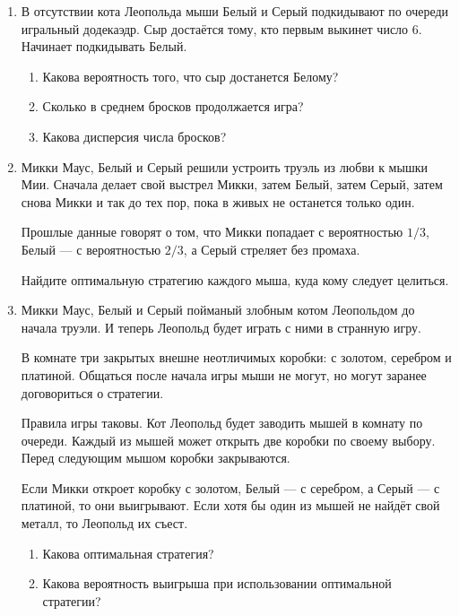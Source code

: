\begin{enumerate}
\item В отсутствии кота Леопольда мыши Белый и Серый подкидывают по очереди
игральный додекаэдр.
Сыр достаётся тому, кто первым выкинет число 6. Начинает подкидывать Белый.
\begin{enumerate}
  \item Какова вероятность того, что сыр достанется Белому?
  \item Сколько в среднем бросков продолжается игра?
  \item Какова дисперсия числа бросков?
\end{enumerate}

\item Микки Маус, Белый и Серый решили устроить труэль из любви к мышки Мии.
Сначала делает свой выстрел Микки, затем Белый, затем Серый, затем снова Микки и так до тех пор,
пока в живых не останется только один.

Прошлые данные говорят о том, что Микки попадает с вероятностью $1/3$,
Белый — с вероятностью $2/3$, а Серый стреляет без промаха.

Найдите оптимальную стратегию каждого мыша, куда кому следует целиться.

\item Микки Маус, Белый и Серый пойманый злобным котом Леопольдом до начала труэли.
И теперь Леопольд будет играть с ними в странную игру.

В комнате три закрытых внешне неотличимых коробки: с золотом, серебром и платиной.
Общаться после начала игры мыши не могут, но могут заранее договориться о стратегии.

Правила игры таковы. Кот Леопольд будет заводить мышей в комнату по очереди.
Каждый из мышей может открыть две коробки по своему выбору.
Перед следующим мышом коробки закрываются.

Если Микки откроет коробку с золотом, Белый — с серебром, а Серый — с платиной,
то они выигрывают. Если хотя бы один из мышей не найдёт свой металл, то Леопольд
их съест.
\begin{enumerate}
\item Какова оптимальная стратегия?
\item Какова вероятность выигрыша при использовании оптимальной стратегии?
\end{enumerate}


\end{enumerate}
